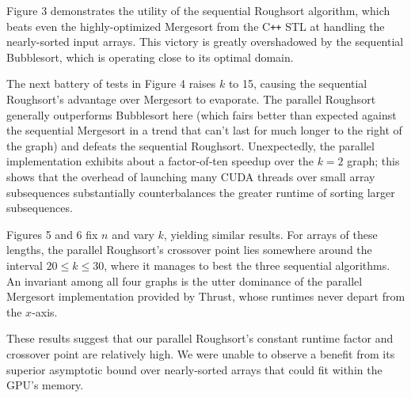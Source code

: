\documentclass[letterpaper, 12pt]{article}
\begin{document}
Figure 3 demonstrates the utility of the sequential Roughsort algorithm, which beats even the highly-optimized Mergesort from
  the C\texttt{++} STL at handling the nearly-sorted input arrays.
This victory is greatly overshadowed by the sequential Bubblesort, which is operating close to its optimal domain.

The next battery of tests in Figure 4 raises $k$ to 15, causing the sequential Roughsort's advantage over Mergesort to evaporate.
The parallel Roughsort generally outperforms Bubblesort here (which fairs better than expected against the sequential Mergesort
  in a trend that can't last for much longer to the right of the graph) and defeats the sequential Roughsort.
Unexpectedly, the parallel implementation exhibits about a factor-of-ten speedup over the $k = 2$ graph; this shows that
  the overhead of launching many CUDA threads over small array subsequences substantially counterbalances the greater runtime
  of sorting larger subsequences.

Figures 5 and 6 fix $n$ and vary $k$, yielding similar results.
For arrays of these lengths, the parallel Roughsort's crossover point lies somewhere around the interval $20 \leq k \leq 30$,
  where it manages to best the three sequential algorithms.
An invariant among all four graphs is the utter dominance of the parallel Mergesort implementation provided by Thrust,
  whose runtimes never depart from the $x$-axis.

These results suggest that our parallel Roughsort's constant runtime factor and crossover point are relatively high.
We were unable to observe a benefit from its superior asymptotic bound over nearly-sorted arrays that could fit within the
GPU's memory.

\begin{sidewaysfigure}

\vspace{-4ex}
\caption{\label{fig:k2}{\em
  Sort Runtimes over Arrays of Length $n\cdot 10^6$, $k = 2$
}}
\end{sidewaysfigure}

\begin{sidewaysfigure}

\vspace{-4ex}
\caption{\label{fig:k15}{\em
  Sort Runtimes over Arrays of Length $n\cdot 10^6$, $k = 15$
}}
\end{sidewaysfigure}

\begin{sidewaysfigure}

\vspace{-4ex}
\caption{\label{fig:n750k}{\em
  Sort Runtimes over Arrays of Radius $k$, $n = 0.75\cdot 10^6$
}}
\end{sidewaysfigure}
\end{document}
